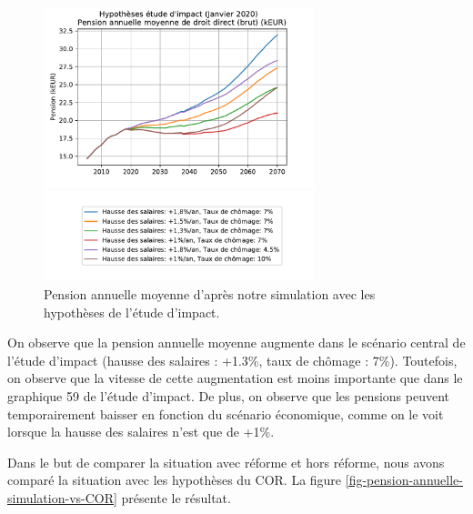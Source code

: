\documentclass[10pt]{article}
\begin{document}
\begin{figure}
\begin{center}
\includegraphics[width=0.7\textwidth]{Simulation-pension-annuelle-moyenne.pdf}

\includegraphics[width=0.7\textwidth]{Simulation-legende.pdf}
\end{center}

\caption{Pension annuelle moyenne d'après notre simulation 
avec les hypothèses de l'étude d'impact.}
\label{fig-pension-annuelle-simulation}
\end{figure}

On observe que la pension annuelle moyenne augmente dans le scénario central de 
l'étude d'impact (hausse des salaires : +1.3\%, taux de chômage : 7\%). 
Toutefois, on observe que la vitesse de cette augmentation est moins importante 
que dans le graphique 59 de l'étude d'impact. 
De plus, on observe que les pensions peuvent temporairement baisser en fonction 
du scénario économique, comme on le voit lorsque la hausse des salaires n'est que 
de +1\%. 

Dans le but de comparer la situation avec réforme et hors réforme, nous 
avons comparé la situation avec les hypothèses du COR. 
La figure \ref{fig-pension-annuelle-simulation-vs-COR} présente le résultat. 
\end{document}
